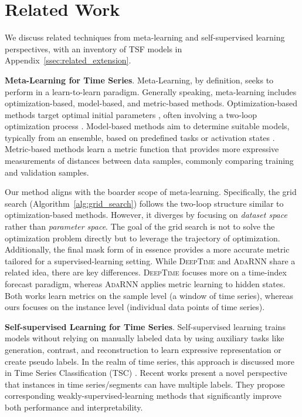 \section{Related Work}

We discuss related techniques from meta-learning and self-supervised learning perspectives, with an inventory of TSF models in Appendix~\ref{ssec:related_extension}.

\textbf{Meta-Learning for Time Series}.
Meta-Learning, by definition, seeks to perform in a learn-to-learn paradigm. Generally speaking, meta-learning includes optimization-based, model-based, and metric-based methods. Optimization-based methods target optimal initial parameters \citep{maml}, often involving a two-loop optimization process \citep{metats, deeptime}. Model-based methods aim to determine suitable models, typically from an ensemble, based on predefined tasks \citep{hive-cote, hive-cote2} or activation states \citep{autoforecast}. 
Metric-based methods \citep{adarnn, deeptime} learn a metric function that provides more expressive measurements of distances between data samples, commonly comparing training and validation samples. 

Our method \model{} aligns with the boarder scope of meta-learning. 
Specifically, the grid search (Algorithm~\ref{alg:grid_search}) follows the two-loop structure similar to optimization-based methods. However, it diverges by focusing on \emph{dataset space} rather than \emph{parameter space}.
The goal of the grid search is not to solve the optimization problem directly but to leverage the trajectory of optimization.
Additionally, the final mask form of \model{} in essence provides a more accurate metric tailored for a supervised-learning setting. 
%
While \textsc{DeepTime} \citep{deeptime} and \textsc{AdaRNN} \citep{adarnn} share a related idea, there are key differences. 
\textsc{DeepTime} focuses more on a time-index forecast paradigm, whereas \textsc{AdaRNN} applies metric learning to hidden states. 
Both works learn metrics on the sample level (a window of time series), whereas ours focuses on the instance level (individual data points of time series).

\textbf{Self-supervised Learning for Time Series}.
Self-supervised learning trains models without relying on manually labeled data by using auxiliary tasks like generation, contrast, and reconstruction to learn expressive representation or create pseudo labels. 
%
In the realm of time series, this approach is discussed more in Time Series Classification (TSC) \citep{sslclassification1, sslclassification2, ssl_con_gen}. 
Recent works \citep{millet, timemil} present a novel perspective that instances in time series/segments can have multiple labels. 
They propose corresponding weakly-supervised-learning methods that significantly improve both performance and interpretability. 

